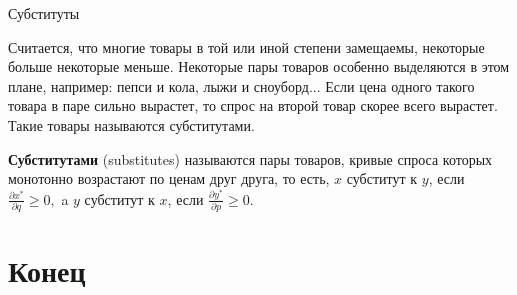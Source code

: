 \documentclass{beamer}
\begin{document}
\begin{frame}{Субституты}

Считается, что многие товары в той или иной степени замещаемы, некоторые больше некоторые меньше. Некоторые пары товаров особенно выделяются в этом плане, например: пепси и кола, лыжи и сноуборд... Если цена одного такого товара в паре сильно вырастет, то спрос на второй товар скорее всего вырастет. Такие товары называются субститутами.

\begin{definition}
\textbf{Субститутами} (substitutes) называются пары товаров, кривые спроса которых монотонно возрастают по ценам друг друга, то есть, $x$ субститут к $y$, если $\frac{\partial x^{\ast}}{\partial q} \geqslant 0,$ a $y$ субститут к $x$, если $\frac{\partial y^{\ast}}{\partial p} \geqslant 0.$
\end{definition}

\end{frame}


\section{Конец}
\end{document}

